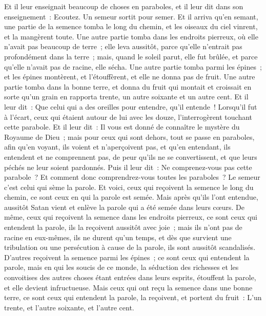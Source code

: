 \begin{multicols}{2}
Et il leur enseignait beaucoup de choses en paraboles, et il leur dit dans son enseignement~:
Ecoutez. Un semeur sortit pour semer.
Et il arriva qu'en semant, une partie de la semence tomba le long du chemin, et les oiseaux du ciel vinrent, et la mangèrent toute.
Une autre partie tomba dans les endroits pierreux, où elle n'avait pas beaucoup de terre~; elle leva aussitôt, parce qu'elle n'entrait pas profondément dans la terre~;
mais, quand le soleil parut, elle fut brûlée, et parce qu'elle n'avait pas de racine, elle sécha.
Une autre partie tomba parmi les épines~; et les épines montèrent, et l'étouffèrent, et elle ne donna pas de fruit.
Une autre partie tomba dans la bonne terre, et donna du fruit qui montait et croissait en sorte qu'un grain en rapporta trente, un autre soixante et un autre cent.
Et il leur dit~: Que celui qui a des oreilles pour entendre, qu'il entende~!
Lorsqu'il fut à l'écart, ceux qui étaient autour de lui avec les douze, l'interrogèrent touchant cette parabole.
Et il leur dit~: Il vous est donné de connaître le mystère du Royaume de Dieu~; mais pour ceux qui sont dehors, tout se passe en paraboles,
afin qu'en voyant, ils voient et n'aperçoivent pas, et qu'en entendant, ils entendent et ne comprennent pas, de peur qu'ils ne se convertissent, et que leurs péchés ne leur soient pardonnés.
Puis il leur dit~: Ne comprenez-vous pas cette parabole~? Et comment donc comprendrez-vous toutes les paraboles~?
Le semeur c'est celui qui sème la parole.
Et voici, ceux qui reçoivent la semence le long du chemin, ce sont ceux en qui la parole est semée. Mais après qu'ils l'ont entendue, aussitôt Satan vient et enlève la parole qui a été semée dans leurs cœurs.
De même, ceux qui reçoivent la semence dans les endroits pierreux, ce sont ceux qui entendent la parole, ils la reçoivent aussitôt avec joie~;
mais ils n'ont pas de racine en eux-mêmes, ils ne durent qu'un temps, et dès que survient une tribulation ou une persécution à cause de la parole, ils sont aussitôt scandalisés.
D'autres reçoivent la semence parmi les épines~; ce sont ceux qui entendent la parole,
mais en qui les soucis de ce monde, la séduction des richesses et les convoitises des autres choses étant entrées dans leurs esprits, étouffent la parole, et elle devient infructueuse.
Mais ceux qui ont reçu la semence dans une bonne terre, ce sont ceux qui entendent la parole, la reçoivent, et portent du fruit~: L'un trente, et l'autre soixante, et l'autre cent.

\end{multicols}
